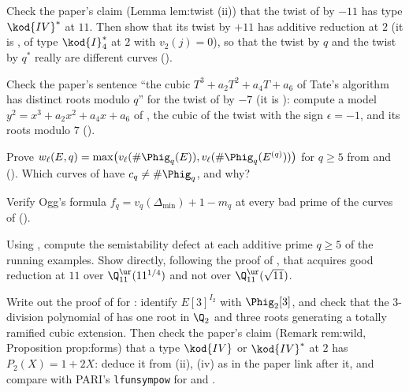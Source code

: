\begin{exercise}\label{exer:reduction:twist121}
Check the paper's claim (Lemma lem:twist (ii)) that the twist of  by $-11$ has type $\kod{IV}^*$ at $11$. Then show that its twist
by $+11$ has additive reduction at $2$ (it is , of type $\kod{I}_4^*$ at $2$ with $v_2(j)=0$), so that the twist by $q$ and the
twist by $q^*$ really are different curves ().
\end{exercise}

\begin{exercise}\label{exer:reduction:cubic}
Check the paper's sentence ``the cubic $T^3+a_2T^2+a_4T+a_6$ of Tate's algorithm has distinct roots modulo $q$'' for the twist of
 by $-7$ (it is ): compute a model $y^2=x^3+a_2x^2+a_4x+a_6$ of , the cubic of the twist with the sign
$\epsilon=-1$, and its roots modulo $7$ ().
\end{exercise}

\begin{exercise}\label{exer:reduction:weight}
Prove $w_\ell(E,q)=\max\bigl(v_\ell(\#\Phig_q(E)),v_\ell(\#\Phig_q(E^{(q)}))\bigr)$ for $q\ge5$ from  and
 (). Which curves of  have
$c_q\ne\#\Phig_q$, and why?
\end{exercise}

\begin{exercise}\label{exer:reduction:ogg}
Verify Ogg's formula $f_q=v_q(\Delta_{\min})+1-m_q$ at every bad prime of the curves of 
().
\end{exercise}

\begin{exercise}\label{exer:reduction:defects}
Using , compute the semistability defect at each additive prime $q\ge5$ of the running examples. Show directly,
following the proof of , that  acquires good reduction at $11$ over $\Q_{11}^{\ur}(11^{1/4})$ and not over
$\Q_{11}^{\ur}(\sqrt{11})$.
\end{exercise}

\begin{exercise}\label{exer:reduction:IV2}
Write out the proof of  for : identify $E[3]^{I_2}$ with $\Phig_2[3]$, and check that the $3$-division
polynomial of  has one root in $\Q_2$ and three roots generating a totally ramified cubic extension. Then check the paper's claim
(Remark rem:wild, Proposition prop:forms) that a type $\kod{IV}$ or $\kod{IV}^*$ at $2$ has $P_2(X)=1+2X$: deduce it from
(ii), (iv) as in the paper link after it, and compare with PARI's \texttt{lfunsympow} for  and
.
\end{exercise}

